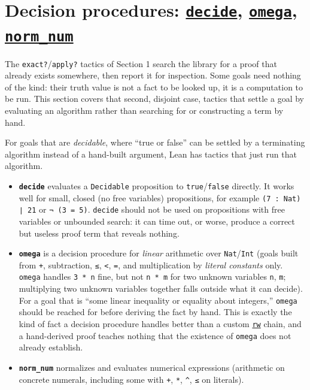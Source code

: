 \section{\texorpdfstring{Decision procedures: \href{https://lean-lang.org/doc/reference/latest/Tactic-Proofs/Tactic-Reference/}{\texttt{decide}}, \href{https://lean-lang.org/doc/reference/latest/Tactic-Proofs/Tactic-Reference/}{\texttt{omega}}, \href{https://lean-lang.org/doc/reference/latest/Tactic-Proofs/Tactic-Reference/}{\texttt{norm\_num}}}{Decision procedures: decide, omega, norm\_num}}\label{sec:12-working-efficiently:02-decision-procedures:1}

The \texttt{exact?}/\texttt{apply?} tactics of Section 1 search the library for a proof that already exists somewhere, then report it for inspection. Some goals need nothing of the kind: their truth value is not a fact to be looked up, it is a computation to be run. This section covers that second, disjoint case, tactics that settle a goal by evaluating an algorithm rather than searching for or constructing a term by hand.

For goals that are \emph{decidable}, where ``true or false'' can be settled by a terminating algorithm instead of a hand-built argument, Lean has tactics that just run that algorithm.

\begin{itemize}
\tightlist
\item
  \textbf{\texttt{decide}} evaluates a \texttt{Decidable} proposition to \texttt{true}/\texttt{false} directly. It works well for small, closed (no free variables) propositions, for example \texttt{(7 : Nat) ∣ 21} or \texttt{¬ (3 = 5)}. \texttt{decide} should not be used on propositions with free variables or unbounded search: it can time out, or worse, produce a correct but useless proof term that reveals nothing.
\item
  \textbf{\texttt{omega}} is a decision procedure for \emph{linear} arithmetic over \texttt{Nat}/\texttt{Int} (goals built from \texttt{+}, subtraction, \texttt{≤}, \texttt{<}, \texttt{=}, and multiplication by \emph{literal constants} only. \texttt{omega} handles \texttt{3 * n} fine, but not \texttt{n * m} for two unknown variables \texttt{n}, \texttt{m}; multiplying two unknown variables together falls outside what it can decide). For a goal that is ``some linear inequality or equality about integers,'' \texttt{omega} should be reached for before deriving the fact by hand. This is exactly the kind of fact a decision procedure handles better than a custom \href{https://lean-lang.org/doc/reference/latest/Tactic-Proofs/Tactic-Reference/}{\texttt{rw}} chain, and a hand-derived proof teaches nothing that the existence of \texttt{omega} does not already establish.
\item
  \textbf{\texttt{norm\_\allowbreak{}num}} normalizes and evaluates numerical expressions (arithmetic on concrete numerals, including some with \texttt{+}, \texttt{*}, \texttt{\^}, \texttt{≤} on literals).
\end{itemize}

